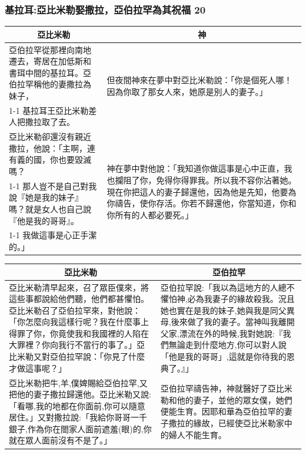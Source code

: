\subsubsection{基拉耳:亞比米勒娶撒拉，亞伯拉罕為其祝福 20}
\begin{table}[H]
\centering
\begin{tabular}{p{8.75cm}|p{8.50cm}}\hline\hline
\multicolumn{1}{c|}{亞比米勒}&\multicolumn{1}{c}{神}\\\hline
亞伯拉罕從那裡向南地遷去，寄居在加低斯和書珥中間的基拉耳。亞伯拉罕稱他的妻撒拉為妹子，
&\multirow{2}{8.5cm}{但夜間神來在夢中對亞比米勒說：「你是個死人哪！因為你取了那女人來，她原是別人的妻子。」}\\\cline{1-1}
基拉耳王亞比米勒差人把撒拉取了去。&\\\hline\hline
亞比米勒卻還沒有親近撒拉，他說：「主啊，連有義的國，你也要毀滅嗎？
&\multirow{3}{8.5cm}{神在夢中對他說：「我知道你做這事是心中正直，我也攔阻了你，免得你得罪我。所以我不容你沾著她。現在你把這人的妻子歸還他，因為他是先知，他要為你禱告，使你存活。你若不歸還他，你當知道，你和你所有的人都必要死。」}\\\cline{1-1}
那人豈不是自己對我說『她是我的妹子』嗎？就是女人也自己說『他是我的哥哥』。&\\\cline{1-1}
我做這事是心正手潔的。」&\\\hline
\end{tabular}
\end{table}


\begin{table}[H]
\centering
\begin{tabular}{p{8.75cm}|p{8.50cm}}\hline\hline
\multicolumn{1}{c|}{亞比米勒}&\multicolumn{1}{c}{亞伯拉罕}\\\hline
亞比米勒清早起來，召了眾臣僕來，將這些事都說給他們聽，他們都甚懼怕。亞比米勒召了亞伯拉罕來，對他說：「你怎麼向我這樣行呢？我在什麼事上得罪了你，你竟使我和我國裡的人陷在大罪裡？你向我行不當行的事了。」亞比米勒又對亞伯拉罕說：「你見了什麼才做這事呢？」
&亞伯拉罕說:「我以為這地方的人總不懼怕神,必為我妻子的緣故殺我。況且她也實在是我的妹子,她與我是同父異母,後來做了我的妻子。當神叫我離開父家,漂流在外的時候,我對她說:『我們無論走到什麼地方,你可以對人說「他是我的哥哥」,這就是你待我的恩典了。』」\\\hline
亞比米勒把牛,羊,僕婢賜給亞伯拉罕,又把他的妻子撒拉歸還他。亞比米勒又說:「看哪,我的地都在你面前,你可以隨意居住。」又對撒拉說:「我給你哥哥一千銀子,作為你在閤家人面前遮羞(眼)的,你就在眾人面前沒有不是了。」
&亞伯拉罕禱告神，神就醫好了亞比米勒和他的妻子，並他的眾女僕，她們便能生育。因耶和華為亞伯拉罕的妻子撒拉的緣故，已經使亞比米勒家中的婦人不能生育。\\\hline
\end{tabular}
\end{table}


